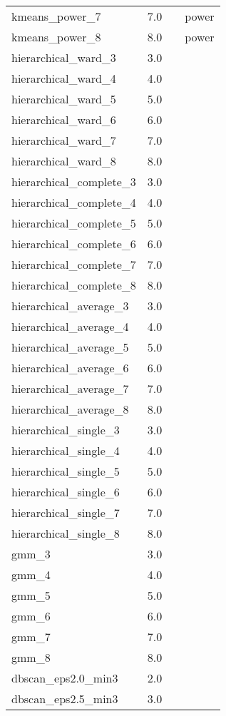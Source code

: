 \begin{tabular}{llll}
kmeans\_power\_7 & 7.0 &  & power \\ 
kmeans\_power\_8 & 8.0 &  & power \\ 
hierarchical\_ward\_3 & 3.0 &  &  \\ 
hierarchical\_ward\_4 & 4.0 &  &  \\ 
hierarchical\_ward\_5 & 5.0 &  &  \\ 
hierarchical\_ward\_6 & 6.0 &  &  \\ 
hierarchical\_ward\_7 & 7.0 &  &  \\ 
hierarchical\_ward\_8 & 8.0 &  &  \\ 
hierarchical\_complete\_3 & 3.0 &  &  \\ 
hierarchical\_complete\_4 & 4.0 &  &  \\ 
hierarchical\_complete\_5 & 5.0 &  &  \\ 
hierarchical\_complete\_6 & 6.0 &  &  \\ 
hierarchical\_complete\_7 & 7.0 &  &  \\ 
hierarchical\_complete\_8 & 8.0 &  &  \\ 
hierarchical\_average\_3 & 3.0 &  &  \\ 
hierarchical\_average\_4 & 4.0 &  &  \\ 
hierarchical\_average\_5 & 5.0 &  &  \\ 
hierarchical\_average\_6 & 6.0 &  &  \\ 
hierarchical\_average\_7 & 7.0 &  &  \\ 
hierarchical\_average\_8 & 8.0 &  &  \\ 
hierarchical\_single\_3 & 3.0 &  &  \\ 
hierarchical\_single\_4 & 4.0 &  &  \\ 
hierarchical\_single\_5 & 5.0 &  &  \\ 
hierarchical\_single\_6 & 6.0 &  &  \\ 
hierarchical\_single\_7 & 7.0 &  &  \\ 
hierarchical\_single\_8 & 8.0 &  &  \\ 
gmm\_3 & 3.0 &  &  \\ 
gmm\_4 & 4.0 &  &  \\ 
gmm\_5 & 5.0 &  &  \\ 
gmm\_6 & 6.0 &  &  \\ 
gmm\_7 & 7.0 &  &  \\ 
gmm\_8 & 8.0 &  &  \\ 
dbscan\_eps2.0\_min3 & 2.0 &  &  \\ 
dbscan\_eps2.5\_min3 & 3.0 &  &  \\ 

\end{tabular}
